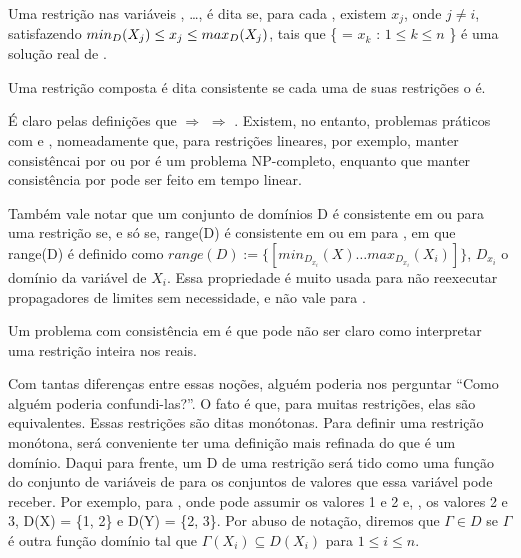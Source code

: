 \documentclass{article}
\begin{document}
\begin{definition}
  Uma restrição  nas variáveis , \dots,  é dita
  se, para cada , existem  $x_j$, onde $j \neq i$,
  satisfazendo $min_D(\textit{$X_j$}) \leq x_j \leq max_D(\textit{$X_j$})$,
  tais que \{ = $x_k$ : $1 \leq k \leq n$ \}
  é uma solução real de .

  Uma restrição composta é dita \boundr{} consistente se cada uma de suas restrições o é.
\end{definition}

É claro pelas definições que \boundd{} $\Rightarrow$ \boundz{} $\Rightarrow$ \boundr. Existem, no
entanto, problemas práticos com \boundd{} e \boundz, nomeadamente que, para restrições lineares, por
exemplo, manter consistêncai por \boundd{} ou por \boundz{} é um problema NP-completo, enquanto que
manter consistência por \boundr{} pode ser feito em tempo linear.

Também vale notar que um conjunto de domínios D é consistente em \boundz{} ou \boundr{} para uma
restrição  se, e só se, range(D) é consistente em \boundz{} ou em \boundr{} para
, em que range(D) é definido como $range(D) := \{[min_D_x_i(X) \ldots  max_D_x_i(X_i)]\}$, $D_x_i$ o domínio da
variável de  $X_i$. Essa propriedade é muito usada para não reexecutar propagadores
de limites sem necessidade, e não vale para \boundd{}.

Um problema com consistência em \boundr{} é que pode não ser claro como interpretar uma restrição
inteira nos reais.

Com tantas diferenças entre essas noções, alguém poderia nos perguntar ``Como alguém poderia
confundi-las?''. O fato é que, para muitas restrições, elas são equivalentes. Essas restrições são
ditas monótonas. Para definir uma restrição monótona, será conveniente ter uma definição mais
refinada do que é um domínio. Daqui para frente, um  D de uma restrição
 será tido como uma função do conjunto de variáveis de  para os conjuntos de
valores que essa variável pode receber. Por exemplo, para , onde 
pode assumir os valores 1 e 2 e, , os valores 2 e 3, D(X) = \{1, 2\} e D(Y) = \{2, 3\}. Por
abuso de notação, diremos que $\Gamma \in D$ se $\Gamma$ é outra função domínio tal que $\Gamma(X_i)
\subseteq D(X_i)$ para $1 \leq i \leq n$.
\end{document}
